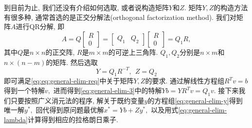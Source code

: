 \documentclass{SBCbookchapter}
\numberwithin{equation}{section}
\begin{document}
到目前为止, 我们还没有介绍如何选取, 或者说构造矩阵$Y$和$Z.$ 矩阵$Y, Z$的构造方法有很多种, 通常首选的是正交分解法(orthogonal factorization method). 我们对矩阵$A$进行QR分解, 即
\begin{equation}
\label{eq:quadratic-programming-qr-decomp-1}
A = Q \begin{bmatrix} R \\ 0 \end{bmatrix} = \begin{bmatrix} Q_1 & Q_2 \end{bmatrix} \begin{bmatrix} R \\ 0 \end{bmatrix} = Q_1 R,
\end{equation}
其中$Q$是$n\times n$的正交阵, $R$是$m\times m$的可逆上三角阵. $Q_1, Q_2$分别是$n\times m$和$n\times (n - m)$的矩阵. 然后选取
\begin{equation}
\label{eq:quadratic-programming-qr-decomp-2}
Y = Q_1 R^{-T}, ~~ Z = Q_2
\end{equation}
即可满足\eqref{eq:eq:general-elim-req}中关于矩阵$Y, Z$的要求. 通过解线性方程组$R^T v = b$得到一个特解$v,$ 进而得到\eqref{eq:general-elim-3}中的特解$Y b = Y R^T v = Q_1 v.$ 接下来我们只要按照广义消元法的程序, 解关于既约变量$y$的方程组\eqref{eq:general-elim-y}得到唯一解$y^*,$ 回代得到原问题最优解$x^* = Y b + Z y^*,$ 以及用式\eqref{eq:general-elim-lambda}计算得到相应的拉格朗日乘子.
\end{document}
